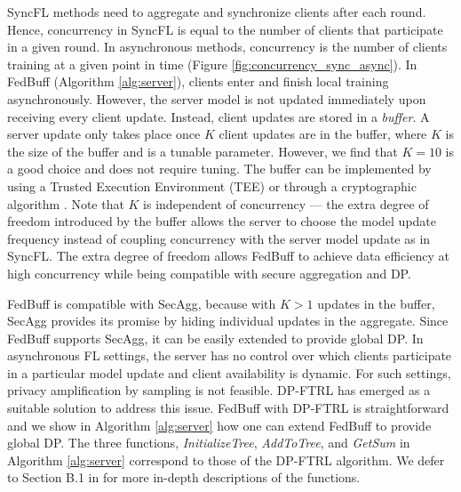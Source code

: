 \documentclass[twoside]{article}
\newcommand{\kshitiz}[1]{\todo[color=red!20,size=\footnotesize,inline,caption={}]{KM: #1}{}}
\newcommand{\algname}{{FedBuff}\xspace}
\newcommand{\syncfl}{{SyncFL}\xspace}
\begin{document}
\syncfl methods need to aggregate and synchronize clients after each round. Hence, concurrency in \syncfl is equal to the number of clients that participate in a given round. In asynchronous methods, concurrency is the number of clients training at a given point in time (Figure \ref{fig:concurrency_sync_async}). In \algname{} (Algorithm \ref{alg:server}), clients enter and finish local training asynchronously. However, the server model is not updated immediately upon receiving every client update. Instead, client updates are stored in a \textit{buffer}. A server update only takes place once $K$ client updates are in the buffer, where $K$ is the size of the buffer and is a tunable parameter. However, we find that $K = 10$ is a good choice and does not require tuning. The buffer can be implemented by using a Trusted Execution Environment (TEE) \citep{secagg-sgx, tee_ppfl} or through a cryptographic algorithm \citep{so_buffsecagg}. 
Note that $K$ is independent of concurrency --- the extra degree of freedom introduced by the buffer allows the server to choose the model update frequency instead of coupling concurrency with the server model update as in \syncfl. The extra degree of freedom  allows \algname{} to achieve data efficiency at high concurrency while being compatible with secure aggregation and DP.



\algname is compatible with SecAgg, because with $K>1$ updates in the buffer, SecAgg provides its promise by hiding individual updates in the aggregate. Since \algname supports SecAgg, it can be easily extended to provide global DP. In asynchronous FL settings, the server has no control over which clients participate in a particular model update and client availability is dynamic. For such settings, privacy amplification by sampling is not feasible. DP-FTRL \citep{dpftrl} has emerged as a suitable solution to address this issue. \algname with DP-FTRL is straightforward and we show in Algorithm \ref{alg:server} how one can extend \algname to provide global DP. The three functions, \textit{InitializeTree}, \textit{AddToTree}, and \textit{GetSum} in Algorithm \ref{alg:server} correspond to those of the DP-FTRL algorithm. We defer to Section B.1 in \citep{dpftrl} for more in-depth descriptions of the functions. 
\end{document}
